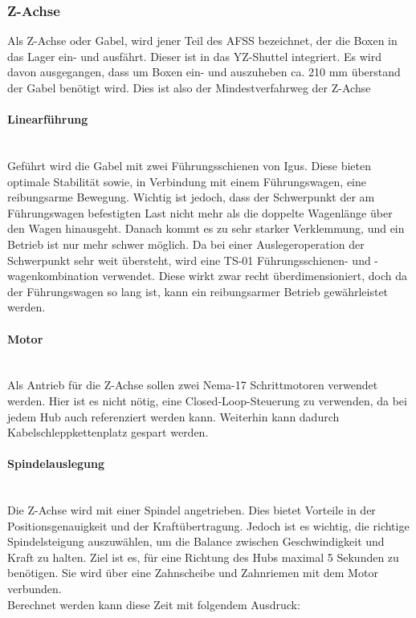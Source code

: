 \subsubsection{Z-Achse}
Als Z-Achse oder Gabel, wird jener Teil des AFSS bezeichnet, der die Boxen in das Lager ein- und ausfährt. Dieser ist in das YZ-Shuttel integriert. Es wird davon ausgegangen, dass um Boxen ein- und auszuheben ca. 210 mm überstand der Gabel benötigt wird. Dies ist also der Mindestverfahrweg der Z-Achse

\paragraph{Linearführung}\mbox{}\\
Geführt wird die Gabel mit zwei Führungsschienen von Igus. Diese bieten optimale Stabilität sowie, in Verbindung mit einem Führungswagen, eine reibungsarme Bewegung. Wichtig ist jedoch, dass der Schwerpunkt der am Führungswagen befestigten Last nicht mehr als die doppelte Wagenlänge über den Wagen hinausgeht. Danach kommt es zu sehr starker Verklemmung, und ein Betrieb ist nur mehr schwer möglich. Da bei einer Auslegeroperation der Schwerpunkt sehr weit übersteht, wird eine TS-01 Führungsschienen- und -wagenkombination verwendet. Diese wirkt zwar recht überdimensioniert, doch da der Führungswagen so lang ist, kann ein reibungsarmer Betrieb gewährleistet werden.

\paragraph{Motor}\mbox{}\\
Als Antrieb für die Z-Achse sollen zwei Nema-17 Schrittmotoren verwendet werden. Hier ist es nicht nötig, eine Closed-Loop-Steuerung zu verwenden, da bei jedem Hub auch referenziert werden kann. Weiterhin kann dadurch Kabelschleppkettenplatz gespart werden.

\paragraph{Spindelauslegung}\mbox{}\\
Die Z-Achse wird mit einer Spindel angetrieben. Dies bietet Vorteile in der Positionsgenauigkeit und der Kraftübertragung. Jedoch ist es wichtig, die richtige Spindelsteigung auszuwählen, um die Balance zwischen Geschwindigkeit und Kraft zu halten. Ziel ist es, für eine Richtung des Hubs maximal 5 Sekunden zu benötigen. Sie wird über eine Zahnscheibe und Zahnriemen mit dem Motor verbunden.\\
Berechnet werden kann diese Zeit mit folgendem Ausdruck:

